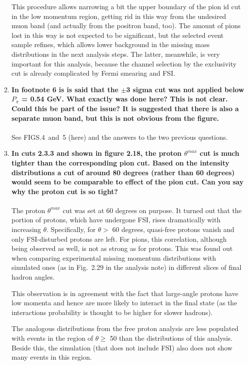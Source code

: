\documentclass[,superscriptaddress,showpacs,amssymb,amsmath,amsfonts,linenumbers,article]{revtex4-1}
\begin{document}
\begin{enumerate}[label=\textbf{\arabic*}.]
This procedure allows narrowing a bit the upper boundary of the pion id cut in the low momentum region, getting rid in this way from the undesired muon band (and actually from the positron band, too). The amount of pions lost in this way is not expected to be significant, but the selected event sample refines, which allows lower background in the missing mass distributions in the next analysis steps. The latter, meanwhile, is very important for this analysis, because the channel selection by the exclusivity cut is already complicated by Fermi smearing and FSI. 

\item{\bf  In footnote 6 is is said that the $\pm$3 sigma cut was not applied below $P_{\pi}$ = 0.54 GeV. What exactly was done here? This is not clear. Could this be part of the issue? It is suggested that there is also a separate muon band, but this is not obvious from the figure.}\\ \\
See FIGS.4~and~5 (here) and the answers to the two previous questions.

\item {\bf In cuts 2.3.3 and shown in figure 2.18, the proton $\theta^{max}$ cut is much tighter than the corresponding pion cut. Based on the intensity distributions a cut of around 80 degrees (rather than 60 degrees) would seem to be comparable to effect of the pion cut. Can you say why the proton cut is so tight?} \\ \\
The proton $\theta^{max}$ cut was set at 60 degrees on purpose. It turned out that the portion of protons, which have undergone FSI, rises dramatically with increasing $\theta$. Specifically, for $\theta > $ 60 degrees, quasi-free protons vanish and only FSI-disturbed protons are left. 
For pions, this correlation, although being observed as well, is not as strong as for protons. This was found out when comparing experimental missing momentum distributions with simulated ones (as in Fig.~2.29 in the analysis note) in different slices of final hadron angles. 

This observation is in agreement with the fact that large-angle protons have low momenta and hence are more likely to interact in the final state (as the interactions probability is thought to be higher for slower hadrons). 

The analogous distributions from the free proton analysis are less populated with events in the region of $\theta \geq$ 50 than the distributions of this analysis. Beside this, the simulation (that does not include FSI) also does not show many events in this region.


\end{enumerate}
\end{document}
